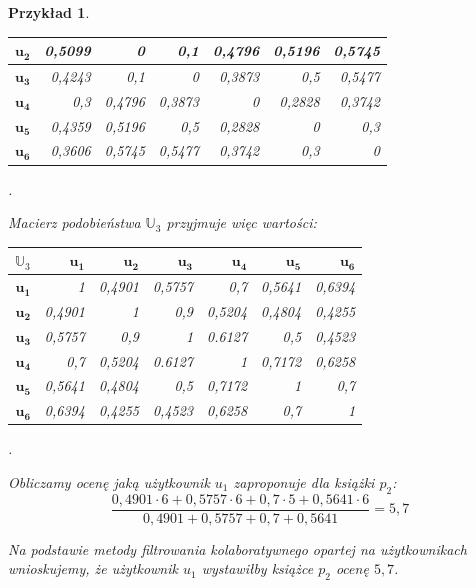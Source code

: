 \documentclass[12pt,a4paper]{report}
\newtheorem{przyklad}{Przykład}[chapter]{\normalfont}
\begin{document}
\begin{przyklad}
\begin{center}
\begin{tabular}{|r|r|r|r|r|r|r|}
\hline
$\mathbf{u_2}$ & 0,5099 & 0 & 0,1 & 0,4796 & 0,5196 & 0,5745 \\
\hline
$\mathbf{u_3}$ & 0,4243 & 0,1 & 0 & 0,3873 & 0,5 & 0,5477 \\
\hline
$\mathbf{u_4}$ & 0,3 & 0,4796 & 0,3873 & 0 & 0,2828 & 0,3742 \\ 
\hline 
$\mathbf{u_5}$ & 0,4359 & 0,5196 & 0,5 & 0,2828 & 0 & 0,3 \\
\hline 
$\mathbf{u_6}$ & 0,3606 & 0,5745 & 0,5477 & 0,3742 & 0,3 & 0 \\ 
\hline 
\end{tabular}.
\end{center}
Macierz podobieństwa $\mathbb{U}_3$ przyjmuje więc wartości:
\begin{center}
\begin{tabular}{|r|r|r|r|r|r|r|} \hline
$\mathbb{U}_3$ & $\mathbf{u_1}$ & $\mathbf{u_2}$ & $\mathbf{u_3}$ & $\mathbf{u_4}$ & $\mathbf{u_5}$ & $\mathbf{u_6}$ \\
\hline
$\mathbf{u_1}$ & 1 & 0,4901 & 0,5757 & 0,7 & 0,5641 & 0,6394 \\
\hline
$\mathbf{u_2}$ & 0,4901 & 1 & 0,9 & 0,5204 & 0,4804 & 0,4255 \\
\hline
$\mathbf{u_3}$ & 0,5757 & 0,9 & 1 & 0.6127 & 0,5 & 0,4523 \\
\hline
$\mathbf{u_4}$ & 0,7 & 0,5204 & 0.6127 & 1 & 0,7172 & 0,6258 \\ 
\hline 
$\mathbf{u_5}$ & 0,5641 & 0,4804 & 0,5 & 0,7172 & 1 & 0,7 \\
\hline 
$\mathbf{u_6}$ & 0,6394 & 0,4255 & 0,4523 & 0,6258 & 0,7 & 1 \\ 
\hline 
\end{tabular}.
\end{center}
Obliczamy ocenę jaką użytkownik $u_1$ zaproponuje dla książki $p_2$:
$$
\frac{0,4901 \cdot 6 + 0,5757 \cdot 6 + 0,7 \cdot 5 + 0,5641 \cdot 6}{0,4901 + 0,5757  + 0,7  + 0,5641} = 5,7
$$

Na podstawie metody filtrowania kolaboratywnego opartej na użytkownikach wnioskujemy, że użytkownik $u_1$ wystawiłby książce $p_2$ ocenę $5,7$.


\end{przyklad}
\end{document}
